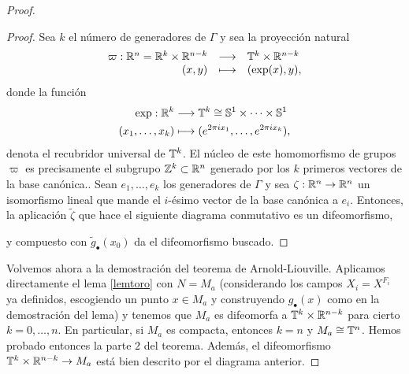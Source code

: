 \begin{proof}
\begin{proof}
  Sea $k$ el número de generadores de $\Gamma$ y sea la proyección natural
  \[
    \begin{array}{rcl}
      \varpi: \mathbb{R}^n = \mathbb{R}^k \times \mathbb{R}^{n-k} & \longrightarrow & \mathbb{T}^k \times \mathbb{R}^{n-k} \\
      (x,y) & \longmapsto & (\exp(x), y),
    \end{array}
  \]
  donde la función
  \begin{align*}
    \exp :\mathbb{R}^k&\longrightarrow \mathbb{T}^k \cong \mathbb{S}^1 \times \cdots \times \mathbb{S}^1\\ 
    (x_1,\dots,x_k) &\longmapsto (e^{2\pi ix_1},\dots,e^{ 2\pi ix_k}), 
    \end{align*}
    denota el recubridor universal de $\mathbb{T}^k$.
  El núcleo de este homomorfismo de grupos $\varpi$ es precisamente el subgrupo $\mathbb{Z}^k\subset \mathbb{R}^n$ generado por los $k$ primeros vectores de la base canónica.. 
  Sean $e_1,\dots,e_k$ los generadores de $\Gamma$ y sea $\zeta:\mathbb{R}^n \rightarrow \mathbb{R}^n$ un isomorfismo lineal que mande el $i$-ésimo vector de la base canónica a $e_i$. Entonces, la aplicación $\tilde{\zeta}$ que hace el siguiente diagrama conmutativo es un difeomorfismo,
  \begin{center}
   \end{center}
   y compuesto con $\tilde{g}_\bullet(x_0)$ da el difeomorfismo buscado.
\end{proof}

Volvemos ahora a la demostración del teorema de Arnold-Liouville. Aplicamos directamente el lema \ref{lemtoro} con $N=M_a$ (considerando los campos $X_i=X^{F_i}$ ya definidos, escogiendo un punto $x\in M_a$ y construyendo $g_\bullet(x)$ como en la demostración del lema) y tenemos que $M_a$ es difeomorfa a $\mathbb{T}^k\times \mathbb{R}^{n-k}$ para cierto $k=0,\dots,n$. En particular, si $M_a$ es compacta, entonces $k=n$ y $M_a\cong \mathbb{T}^n$. Hemos probado entonces la parte $2$ del teorema. Además, el difeomorfismo $\mathbb{T}^k\times \mathbb{R}^{n-k} \rightarrow M_a$ está bien descrito por el diagrama anterior.


\end{proof}
